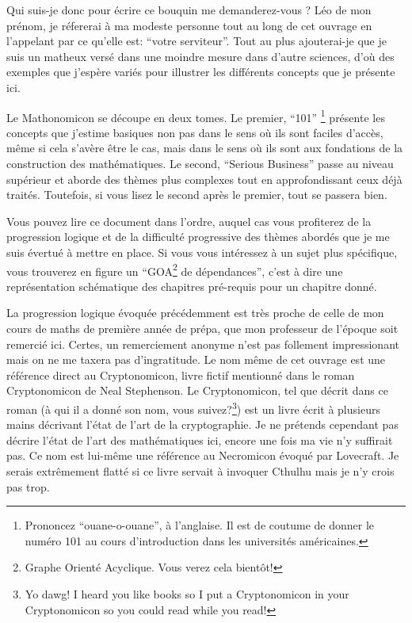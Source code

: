 Qui suis-je donc pour écrire ce bouquin me demanderez-vous ? Léo de
mon prénom, je réfererai à ma modeste personne tout au long de cet
ouvrage en l'appelant par ce qu'elle est: ``votre serviteur''. Tout au
plus ajouterai-je que je suis un matheux versé dans une moindre mesure
dans d'autre sciences, d'où des exemples que j'espère variés pour
illustrer les différents concepts que je présente ici. 

Le Mathonomicon se découpe en deux tomes. Le premier, ``101''
\footnote{Prononcez ``ouane-o-ouane'', à l'anglaise. Il est de coutume
  de donner le numéro 101 au cours d'introduction dans les universités
  américaines.} présente les concepts que j'estime basiques non pas
dans le sens où ils sont faciles d'accès, même si cela s'avère être le
cas, mais dans le sens où ils sont aux fondations de la construction
des mathématiques. Le second, ``Serious Business'' passe au niveau
supérieur et aborde des thèmes plus complexes tout en approfondissant
ceux déjà traités. Toutefois, si vous lisez le second après le
premier, tout se passera bien.

Vous pouvez lire ce document dans l'ordre, auquel cas vous profiterez
de la progression logique et de la difficulté progressive des thèmes
abordés que je me suis évertué à mettre en place. Si vous vous
intéressez à un sujet plus spécifique, vous trouverez en figure
un ``GOA\footnote{Graphe Orienté
  Acyclique. Vous verez cela bientôt!} de dépendances'', c'est à dire
une représentation schématique des chapitres pré-requis pour un
chapitre donné. 


La progression logique évoquée précédemment est très proche de celle
de mon cours de maths de première année de prépa, que mon professeur
de l'époque soit remercié ici. Certes, un remerciement anonyme n'est
pas follement impressionant mais on ne me taxera pas d'ingratitude. Le
nom même de cet ouvrage est une référence direct au Cryptonomicon,
livre fictif mentionné dans le roman Cryptonomicon de Neal
Stephenson. Le Cryptonomicon, tel que décrit dans ce roman (à qui il a
donné son nom, vous suivez?\footnote{Yo dawg! I heard you like books
  so I put a Cryptonomicon in your Cryptonomicon so you could read
  while you read!}) est un livre écrit à plusieurs mains décrivant
l'état de l'art de la cryptographie. Je ne prétends cependant pas
décrire l'état de l'art des mathématiques ici, encore une fois ma vie
n'y suffirait pas. Ce nom est lui-même une référence au Necromicon
évoqué par Lovecraft. Je serais extrêmement flatté si ce livre servait
à invoquer Cthulhu mais je n'y crois pas trop.

